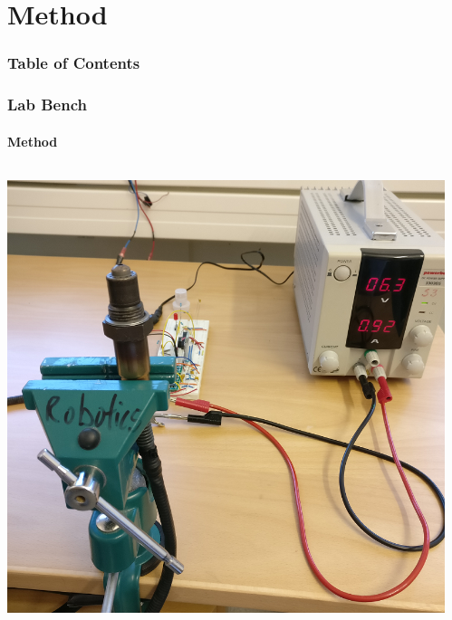 \documentclass %
[																	%
	aspectratio=1610,                                               %
	11pt,															%
	hyperref={pdfpagelabels=false},									%
	xcolor	= pdftex, dvipsnames, table,							%
]																	%
{beamer}															%
\begin{document}
\section{Method}

\begin{frame}
	\frametitle{Table of Contents}
	\tableofcontents[subsectionstyle=hide,
	                currentsection]	%
	
\end{frame}


\begin{frame}
	\frametitle{Lab Bench}
	\framesubtitle{Method}
	
	\begin{columns}[c] %
		\begin{column}{0.5\textwidth}
			\begin{center}
			    \includegraphics[width=\textwidth]{Images/lambda_bench.png}
			\end{center}
		\end{column}
		\begin{column}{0.5\textwidth}
			\begin{itemize}
			\end{itemize}
		\end{column}	
    \end{columns}
    

\end{frame}
\end{document}
